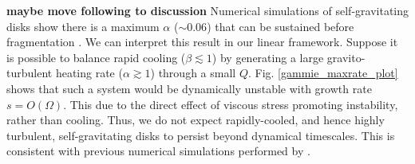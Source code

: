 {\bf maybe move following to discussion}
Numerical simulations of self-gravitating disks show there is a
maximum $\alpha$ ($\sim 0.06$) that can be sustained before
fragmentation \citep{rice11}. We can interpret this result in our
linear framework. 
Suppose it is possible to balance rapid cooling ($\beta\lesssim1$) 
by generating a large gravito-turbulent heating rate
($\alpha\gtrsim 1$) through a small $Q$. Fig. \ref{gammie_maxrate_plot} 
shows that such a system would be dynamically unstable with 
growth rate $s = O(\Omega)$. This due to the direct effect of viscous 
stress promoting instability, rather than cooling. Thus, we do not expect rapidly-cooled, 
and hence highly turbulent, self-gravitating disks to persist beyond
dynamical timescales. This is consistent with previous numerical
simulations performed by \cite{lodato05}. 
